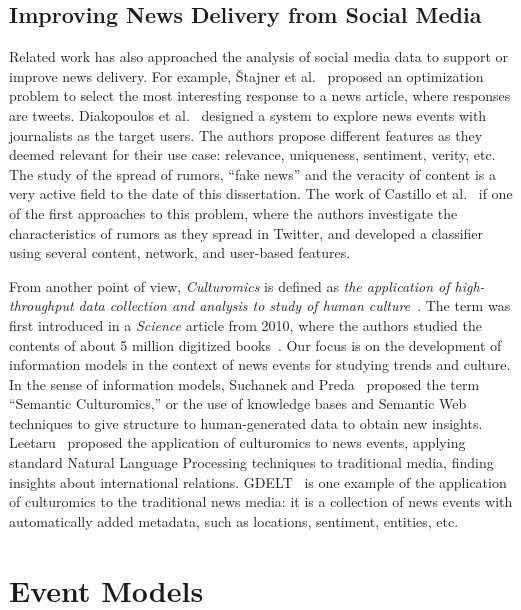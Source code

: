 \subsection{Improving News Delivery from Social Media}
%
Related work has also approached the analysis of social media data to support or
improve news delivery. 
%
For example, \v{S}tajner et al.~\cite{Stajner:2013:ASS:2487575.2487659} proposed
an optimization problem to select the most interesting response to a news
article, where responses are tweets.
%
Diakopoulos et
al.~\cite{Diakopoulos:2012:FAS:2207676.2208409,diakopoulos2010diamonds} designed
a system to explore news events with journalists as the target users.
%
The authors propose different features as they deemed relevant for their use
case: relevance, uniqueness, sentiment, verity, etc. 
%
The study of the spread of rumors, ``fake news'' and the veracity of content is
a very active field to the date of this dissertation.
%
The work of Castillo et al.~\cite{castillo2011information} if one of the first
approaches to this problem, where the authors investigate the characteristics of
rumors as they spread in Twitter, and developed a classifier using several
content, network, and user-based features.
%

From another point of view, {\em Culturomics} is defined as {\em the application
of high-throughput data collection and analysis to study of human
culture}~\cite{Michel176}. 
%
The term was first introduced in a {\em Science} article from 2010, where the
authors studied the contents of about 5 million digitized
books~\cite{Michel176}. 
%
Our focus is on the development of information models in the context
of news events for studying trends and culture.
%
In the sense of information models, Suchanek and
Preda~\cite{Suchanek:2014:SC:2732977.2732994} proposed the term ``Semantic
Culturomics,'' or the use of knowledge bases and Semantic Web techniques to give
structure to human-generated data to obtain new insights.
Leetaru~\cite{leetaru2011culturomics} proposed the application of culturomics to
news events, applying standard Natural Language Processing techniques to
traditional media, finding insights about international relations.
%
GDELT~\cite{leetaru2013gdelt} is one example of the application of culturomics
to the traditional news media: it is a collection of news events with
automatically added metadata, such as locations, sentiment, entities, etc.


\section{Event Models}

